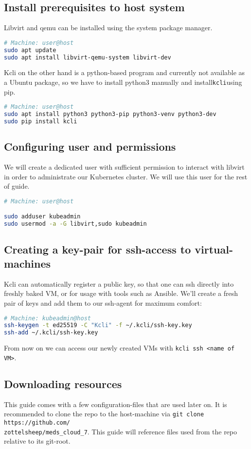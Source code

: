 \subsection{Install prerequisites to host system}
Libvirt and qemu can be installed using the system package manager.
\begin{lstlisting}[language=bash] 
# Machine: user@host
sudo apt update
sudo apt install libvirt-qemu-system libvirt-dev
\end{lstlisting}
Kcli on the other hand is a python-based program and currently not available as a Ubuntu package, so we have to install python3 manually and install\texttt{kcli}using pip.
\begin{lstlisting}[language=bash] 
# Machine: user@host
sudo apt install python3 python3-pip python3-venv python3-dev
sudo pip install kcli
\end{lstlisting}

\subsection{Configuring user and permissions}
We will create a dedicated user with sufficient permission to interact with libvirt in order to administrate our Kubernetes cluster. We will use this user for the rest of guide.
\begin{lstlisting}[language=bash,caption=Create dedicated user for administrating Kubernetes cluster] 
# Machine: user@host

sudo adduser kubeadmin
sudo usermod -a -G libvirt,sudo kubeadmin
\end{lstlisting}

\subsection{Creating a key-pair for ssh-access to virtual-machines}
Kcli can automatically register a public key, so that one can ssh directly into freshly baked VM, or for usage with tools such as Ansible.
We'll create a fresh pair of keys and add them to our ssh-agent for maximum comfort:
\begin{lstlisting}[language=bash,caption=Create SSH-Keypair for Kcli] 
# Machine: kubeadmin@host 
ssh-keygen -t ed25519 -C "Kcli" -f ~/.kcli/ssh-key.key
ssh-add ~/.kcli/ssh-key.key
\end{lstlisting}
From now on we can access our newly created VMs with \texttt{kcli ssh <name of VM>}.

\subsection{Downloading resources}
This guide comes with a few configuration-files that are used later on. It is recommended to clone the repo to the host-machine via \texttt{git clone https://github.com/\\zottelsheep/meds\_cloud\_7}. This guide will reference files used from the repo relative to its git-root.

